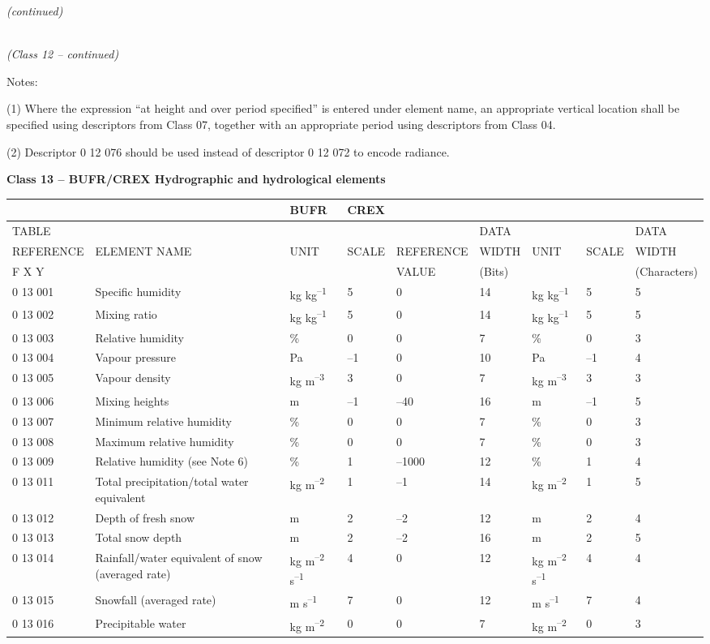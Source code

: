 \emph{(continued)}

\emph{\\
(Class 12 -- continued)}

Notes:

(1) Where the expression ``at height and over period specified'' is entered under element name, an appropriate vertical location shall be specified using descriptors from Class 07, together with an appropriate period using descriptors from Class 04.

(2) Descriptor 0 12 076 should be used instead of descriptor 0 12 072 to encode radiance.

\textbf{Class 13 -- BUFR/CREX Hydrographic and hydrological elements}

\begin{longtable}[]{@{}lllllllll@{}}
\toprule
& & BUFR & CREX & & & & &\tabularnewline
\midrule
\endhead
TABLE & & & & & DATA & & & DATA\tabularnewline
REFERENCE & ELEMENT NAME & UNIT & SCALE & REFERENCE & WIDTH & UNIT & SCALE & WIDTH\tabularnewline
F X Y & & & & VALUE & (Bits) & & & (Characters)\tabularnewline
0 13 001 & Specific humidity & kg kg\textsuperscript{--1} & 5 & 0 & 14 & kg kg\textsuperscript{--1} & 5 & 5\tabularnewline
0 13 002 & Mixing ratio & kg kg\textsuperscript{--1} & 5 & 0 & 14 & kg kg\textsuperscript{--1} & 5 & 5\tabularnewline
0 13 003 & Relative humidity & \% & 0 & 0 & 7 & \% & 0 & 3\tabularnewline
0 13 004 & Vapour pressure & Pa & --1 & 0 & 10 & Pa & --1 & 4\tabularnewline
0 13 005 & Vapour density & kg m\textsuperscript{--3} & 3 & 0 & 7 & kg m\textsuperscript{--3} & 3 & 3\tabularnewline
0 13 006 & Mixing heights & m & --1 & --40 & 16 & m & --1 & 5\tabularnewline
0 13 007 & Minimum relative humidity & \% & 0 & 0 & 7 & \% & 0 & 3\tabularnewline
0 13 008 & Maximum relative humidity & \% & 0 & 0 & 7 & \% & 0 & 3\tabularnewline
0 13 009 & Relative humidity (see Note 6) & \% & 1 & --1000 & 12 & \% & 1 & 4\tabularnewline
0 13 011 & Total precipitation/total water equivalent & kg m\textsuperscript{--2} & 1 & --1 & 14 & kg m\textsuperscript{--2} & 1 & 5\tabularnewline
0 13 012 & Depth of fresh snow & m & 2 & --2 & 12 & m & 2 & 4\tabularnewline
0 13 013 & Total snow depth & m & 2 & --2 & 16 & m & 2 & 5\tabularnewline
0 13 014 & Rainfall/water equivalent of snow (averaged rate) & kg m\textsuperscript{--2} s\textsuperscript{--1} & 4 & 0 & 12 & kg m\textsuperscript{--2} s\textsuperscript{--1} & 4 & 4\tabularnewline
0 13 015 & Snowfall (averaged rate) & m s\textsuperscript{--1} & 7 & 0 & 12 & m s\textsuperscript{--1} & 7 & 4\tabularnewline
0 13 016 & Precipitable water & kg m\textsuperscript{--2} & 0 & 0 & 7 & kg m\textsuperscript{--2} & 0 & 3\tabularnewline

\end{longtable}
